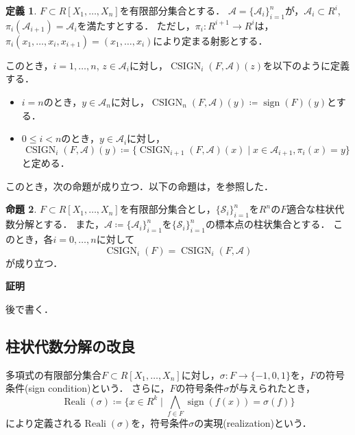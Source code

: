 \documentclass[uplatex, dvipdfmx]{jsarticle}
\makeatletter
\numberwithin{equation}{section}
\renewenvironment{proof}[1][\proofname]{\par
  \pushQED{\qed}%
  \normalfont \topsep6\p@\@plus6\p@\relax
  \trivlist
  \item\relax
  {\bfseries
  #1\@addpunct{.}}\hspace\labelsep\ignorespaces
}{
  \popQED\endtrivlist\@endpefalse
}
\newcommand{\calS}{\mathcal{S}}
\newcommand{\map}[3]{{#1}\colon{#2}\rightarrow{#3}}
\DeclareMathOperator{\Reali}{Reali}
\DeclareMathOperator{\sign}{sign}
\DeclareMathOperator{\CSIGN}{CSIGN}
\theoremstyle{definition}
\newtheorem{definition}{定義}[section]
\newtheorem{proposition}[definition]{命題}
\renewcommand{\proofname}{\textbf{証明}}
\makeatother
\begin{document}
\begin{definition}
     $F \subset R[X_1, \dots, X_n]$を有限部分集合とする．
     $\mathcal{A}=\{\mathcal{A}_{i}\}_{i=1}^n$が，$\mathcal{A}_i \subset R^i$, $\pi_i(\mathcal{A}_{i+1}) = \mathcal{A}_i$を満たすとする．
     ただし，$\map{\pi_i}{R^{i+1}}{R^i}$は，$\pi_i(x_1, \dots, x_i, x_{i+1}) = (x_1, \dots, x_i)$により定まる射影とする．

     このとき，$i=1, \dots, n$, $z \in \mathcal{A}_i$に対し，$\CSIGN_i(F, \mathcal{A})(z)$を以下のように定義する．
     \begin{itemize}
          \item $i=n$のとき，$y \in \mathcal{A}_n$に対し，$\CSIGN_n(F, \mathcal{A})(y)\coloneqq \sign(F)(y)$とする．
          \item $0 \leq i < n$のとき，$y \in \mathcal{A}_i$に対し，
          \begin{equation}
               \CSIGN_i(F, \mathcal{A})(y)\coloneqq \{\CSIGN_{i+1}(F, \mathcal{A})(x) \mid x \in \mathcal{A}_{i+1}, \pi_i(x) = y\}
          \end{equation}
          と定める．
     \end{itemize}
\end{definition}

このとき，次の命題が成り立つ．以下の命題は，\cite[Proposition 11.9.]{MR2248869}を参照した．
\begin{proposition}
     $F \subset R[X_1, \dots, X_n]$を有限部分集合とし，$\{\calS_i\}_{i=1}^n$を$R^n$の$F$適合な柱状代数分解とする．
     また，$\mathcal{A}\coloneqq \{\mathcal{A}_{i}\}_{i=1}^n$を$\{\calS_i\}_{i=1}^n$の標本点の柱状集合とする．
     このとき，各$i=0, \dots, n$に対して
     \begin{equation}
          \CSIGN_i(F) = \CSIGN_i(F, \mathcal{A})
     \end{equation}
     が成り立つ．
\end{proposition}

\begin{proof}
     後で書く．
\end{proof}


\subsection{柱状代数分解の改良}
多項式の有限部分集合$F \subset R[X_1, \dots, X_n]$に対し，$\map{\sigma}{F}{\{-1,0,1\}}$を，$F$の符号条件(sign condition)という．
さらに，$F$の符号条件$\sigma$が与えられたとき，
\begin{equation}
     \Reali(\sigma)\coloneqq \{x \in R^k \mid \bigwedge_{f \in F} \sign(f(x)) = \sigma(f)\}
\end{equation}
により定義される$\Reali(\sigma)$を，符号条件$\sigma$の実現(realization)という．
\end{document}

